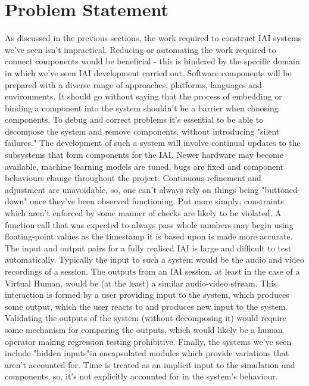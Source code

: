 
\section{Problem Statement}

\label{whatsWrongWithIt}

As discussed in the previous sections, the work required to construct IAI systems we've seen isn't impractical.
Reducing or automating the work required to connect components would be beneficial - this is hindered by the specific domain in which we've seen IAI development carried out.
  Software components will be prepared with a diverse range of approaches, platforms, languages and environments.
    It should go without saying that the process of embedding or binding a component into the system shouldn't be a barrier when choosing components.
    To debug and correct problems it's essential to be able to decompose the system and remove components, without introducing "silent failures."
  The development of such a system will involve continual updates to the subsystems that form components for the IAI.
    Newer hardware may become available, machine learning models are tuned, bugs are fixed and component behaviours change throughout the project.
    Continuous refinement and adjustment are unavoidable, so, one can't always rely on things being "buttoned-down" once they've been observed functioning.
    Put more simply; constraints which aren't enforced by some manner of checks are likely to be violated.
    A function call that was expected to always pass whole numbers may begin using floating-point values as the timestamp it is based upon is made more accurate.
  The input and output pairs for a fully realised IAI is large and difficult to test automatically.
    Typically the input to such a system would be the audio and video recordings of a session.
    The outputs from an IAI session, at least in the case of a Virtual Human, would be (at the least) a similar audio-video stream.
    This interaction is formed by a user providing input to the system, which produces some output, which the user reacts to and produces new input to the system.
    Validating the outputs of the system (without decomposing it) would require some mechanism for comparing the outputs, which would likely be a human operator making regression testing prohibitive.
    Finally, the systems we've seen include "hidden inputs"\footnotemark in encapsulated modules which provide variations that aren't accounted for.
    Time is treated as an implicit input to the simulation and components, so, it's not explicitly accounted for in the system's behaviour.

